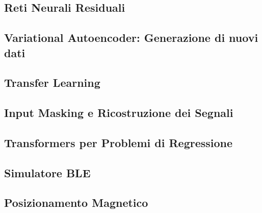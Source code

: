 \documentclass[12pt]{report}
\begin{document}
\subsection{Reti Neurali Residuali}
\subsection{Variational Autoencoder: Generazione di nuovi dati}
\subsection{Transfer Learning}
\subsection{Input Masking e Ricostruzione dei Segnali}
\subsection{Transformers per Problemi di Regressione}
\subsection{Simulatore BLE}
\subsection{Posizionamento Magnetico}

\appendix%
\printbibliography%
\end{document}
